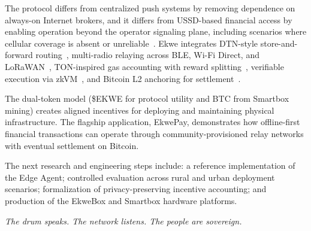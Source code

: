 \documentclass[11pt,a4paper]{article}
\begin{document}
The protocol differs from centralized push systems by removing dependence on always-on Internet brokers, and it differs from USSD-based financial access by enabling operation beyond the operator signaling plane, including scenarios where cellular coverage is absent or unreliable~\cite{apns,etsi_ussd_stage1}. Ekwe integrates DTN-style store-and-forward routing~\cite{rfc4838}, multi-radio relaying across BLE, Wi-Fi Direct, and LoRaWAN~\cite{bt_mesh,wifi_p2p,lorawan}, TON-inspired gas accounting with reward splitting~\cite{ton_whitepaper,ton_fees}, verifiable execution via zkVM~\cite{risczero}, and Bitcoin L2 anchoring for settlement~\cite{sok_btc_l2,bitvm2}.

The dual-token model (\$EKWE for protocol utility and BTC from Smartbox mining) creates aligned incentives for deploying and maintaining physical infrastructure. The flagship application, EkwePay, demonstrates how offline-first financial transactions can operate through community-provisioned relay networks with eventual settlement on Bitcoin.

The next research and engineering steps include: a reference implementation of the Edge Agent; controlled evaluation across rural and urban deployment scenarios; formalization of privacy-preserving incentive accounting; and production of the EkweBox and Smartbox hardware platforms.

\vspace{0.5cm}
\noindent\textit{The drum speaks. The network listens. The people are sovereign.}
\end{document}

